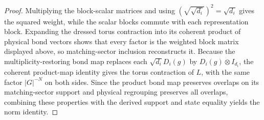 \begin{proof}\leanok
    Multiplying the block-scalar matrices and using
    $(\sqrt{\sqrt{d_i}})^2=\sqrt{d_i}$ gives the squared weight, while the
    scalar blocks commute with each representation block. Expanding the dressed
    torus contraction into its coherent product of physical bond vectors shows
    that every factor is the weighted block matrix displayed above, so
    matching-sector inclusion reconstructs it. Because the
    multiplicity-restoring bond map replaces each $\sqrt{d_i}D_i(g)$ by
    $D_i(g)\otimes I_{d_i}$, the coherent product-map identity gives the torus
    contraction of $L$, with the same factor $|G|^{-N}$ on both sides.
    Since the product bond map preserves overlaps on its matching-sector support
    and physical regrouping preserves all overlaps, combining these properties
    with the derived support and state equality yields the norm identity.
\end{proof}
